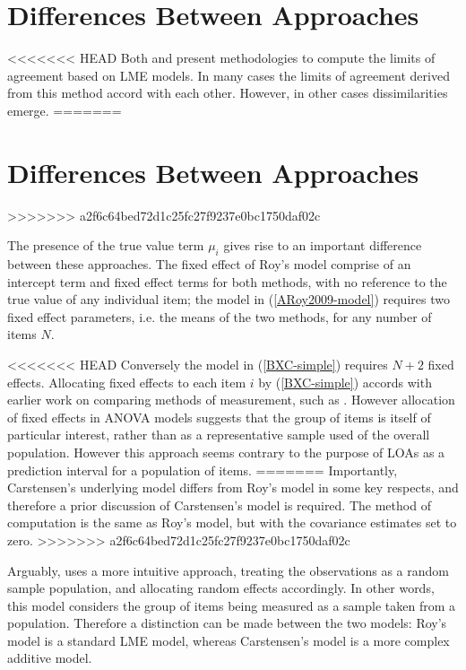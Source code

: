 \documentclass[12pt, a4paper]{report}
\theoremstyle{plain}
\theoremstyle{definition}
\theoremstyle{remark}
\begin{document}
\section{Differences Between Approaches}

<<<<<<< HEAD
Both \citet{BXC2008} and \citet{ARoy2009} present methodologies to compute the limits of agreement based on LME models. In many cases the limits of agreement derived from this method accord with each other. However, in other cases dissimilarities emerge.
=======
\section{Differences Between Approaches}
>>>>>>> a2f6c64bed72d1c25fc27f9237e0bc1750daf02c

The presence of the true value term $\mu_i$ gives rise to an important difference between these approaches. The fixed effect of Roy's model comprise of an intercept term and fixed effect terms for both methods, with no reference to the true value of any individual item; the model in (\ref{ARoy2009-model}) requires two fixed effect parameters, i.e. the means of the two methods, for any number of items $N$.

<<<<<<< HEAD
Conversely the model in (\ref{BXC-simple}) requires $N+2$ fixed effects. Allocating fixed effects to each item $i$ by (\ref{BXC-simple}) accords with earlier work on comparing methods of measurement, such as \citet{Grubbs48}. However allocation of fixed effects in ANOVA models suggests that the group of items is itself of particular interest, rather than as a representative sample used of the overall population. However this approach seems contrary to the purpose of LOAs as a prediction interval for a population of items. 
=======
Importantly, Carstensen's underlying model differs from Roy's model in some key respects, and therefore a prior discussion of Carstensen's model is required. The method of computation is the
same as Roy's model, but with the covariance estimates set to zero.
>>>>>>> a2f6c64bed72d1c25fc27f9237e0bc1750daf02c

Arguably, \citet{ARoy2009} uses a more intuitive approach, treating the observations as a random sample population, and allocating random effects accordingly. In other words, this model considers the group of items being measured as a sample taken from a population. Therefore a distinction can be made between the two models: Roy's model is a standard LME model, whereas Carstensen's model is a more complex additive model.
\end{document}
